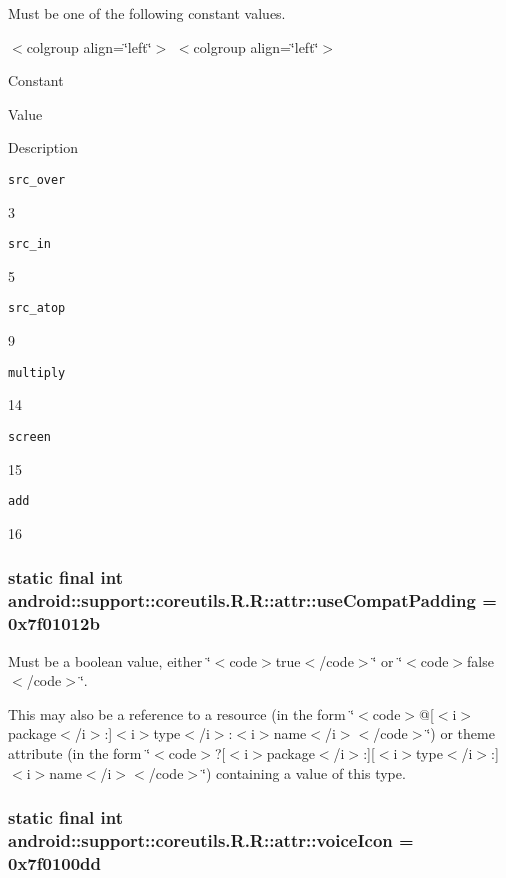 Must be one of the following constant values. \begin{TabularC}{0}
\hline
\end{TabularC}
$<$colgroup align=\char`\"{}left\char`\"{}$>$ $<$colgroup align=\char`\"{}left\char`\"{}$>$ 

Constant

Value

Description 

{\tt src\_\-over}

3

{\tt src\_\-in}

5

{\tt src\_\-atop}

9

{\tt multiply}

14

{\tt screen}

15

{\tt add}

16\hypertarget{classandroid_1_1support_1_1coreutils_1_1_r_1_1attr_d6623b05b2509145c64954c3fd548d00}{
\subsubsection[{useCompatPadding}]{\setlength{\rightskip}{0pt plus 5cm}static final int android::support::coreutils.R.R::attr::useCompatPadding = 0x7f01012b}}
\label{classandroid_1_1support_1_1coreutils_1_1_r_1_1attr_d6623b05b2509145c64954c3fd548d00}


Must be a boolean value, either \char`\"{}$<$code$>$true$<$/code$>$\char`\"{} or \char`\"{}$<$code$>$false$<$/code$>$\char`\"{}. 

This may also be a reference to a resource (in the form \char`\"{}$<$code$>$@\mbox{[}$<$i$>$package$<$/i$>$:\mbox{]}$<$i$>$type$<$/i$>$:$<$i$>$name$<$/i$>$$<$/code$>$\char`\"{}) or theme attribute (in the form \char`\"{}$<$code$>$?\mbox{[}$<$i$>$package$<$/i$>$:\mbox{]}\mbox{[}$<$i$>$type$<$/i$>$:\mbox{]}$<$i$>$name$<$/i$>$$<$/code$>$\char`\"{}) containing a value of this type. \hypertarget{classandroid_1_1support_1_1coreutils_1_1_r_1_1attr_fd395f9a3b77964dc2e3f860dcbf7456}{
\subsubsection[{voiceIcon}]{\setlength{\rightskip}{0pt plus 5cm}static final int android::support::coreutils.R.R::attr::voiceIcon = 0x7f0100dd}}
\label{classandroid_1_1support_1_1coreutils_1_1_r_1_1attr_fd395f9a3b77964dc2e3f860dcbf7456}


